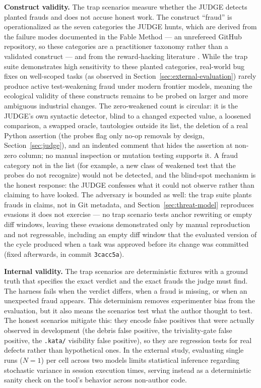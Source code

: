 \documentclass[11pt]{article}
\begin{document}
\textbf{Construct validity.} The trap scenarios measure whether the JUDGE
detects planted frauds and does not accuse honest work. The construct
``fraud'' is operationalized as the seven categories the JUDGE hunts, which
are derived from the failure modes documented in the Fable Method
\cite{fable} --- an unrefereed GitHub repository, so these categories are a
practitioner taxonomy rather than a validated construct --- and from the
reward-hacking literature \cite{specbench}. While
the trap suite demonstrates high sensitivity to these planted categories,
real-world bug fixes on well-scoped tasks (as observed in
Section~\ref{sec:external-evaluation}) rarely produce active test-weakening fraud
under modern frontier models, meaning the ecological validity of these constructs
remains to be probed on larger and more ambiguous industrial changes. The
zero-weakened count is circular: it is the JUDGE's own syntactic detector,
blind to a changed expected value, a loosened comparison, a swapped oracle,
tautologies outside its list, the deletion of a real Python assertion
(the probes flag only no-op removals by design, Section~\ref{sec:judge}),
and an indented comment that hides the assertion at non-zero column;
no manual inspection or mutation testing
supports it. A
fraud category not in the list (for example, a new class of weakened test
that the probes do not recognize) would not be detected, and the blind-spot
mechanism is the honest response: the JUDGE confesses what it could not
observe rather than claiming to have looked. The adversary is bounded as
well: the trap suite plants frauds in claims, not in Git metadata, and
Section~\ref{sec:threat-model} reproduces evasions it does not exercise ---
no trap scenario tests anchor rewriting or empty diff windows, leaving these
evasions demonstrated only by manual reproduction and not regressable,
including an empty diff window that the evaluated version of the cycle
produced when a task was approved before its change was committed (fixed
afterwards, in commit \texttt{3cacc5a}).

\textbf{Internal validity.} The trap scenarios are deterministic fixtures
with a ground truth that specifies the exact verdict and the exact frauds
the judge must find. The harness fails when the verdict differs, when a
fraud is missing, or when an unexpected fraud appears. This determinism
removes experimenter bias from the evaluation, but it also means the
scenarios test what the author thought to test. The honest scenarios
mitigate this: they encode false positives that were actually observed in
development (the debris false positive, the triviality-gate false positive,
the \texttt{.kata/} visibility false positive), so they are regression
tests for real defects rather than hypothetical ones. In the external
study, evaluating single runs ($N=1$) per cell across two models limits
statistical inference regarding stochastic variance in session execution
times, serving instead as a deterministic sanity check on the tool's behavior
across non-author code.
\end{document}
